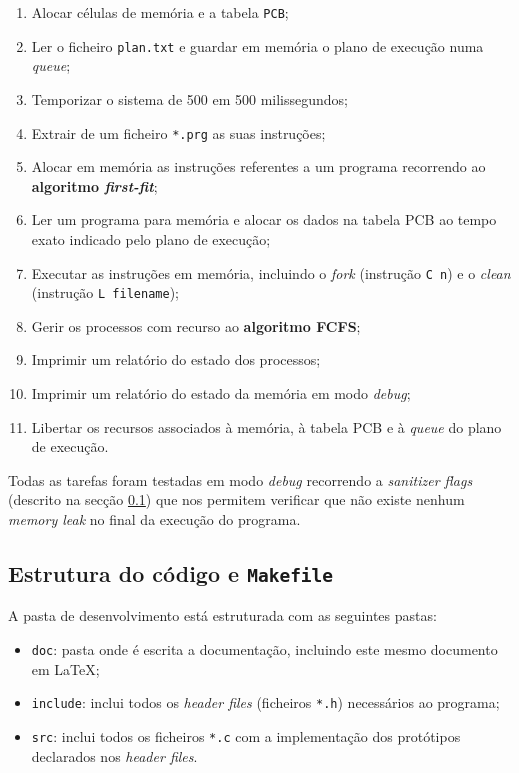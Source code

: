 \documentclass[a4paper,11pt,onecolumn,oneside]{article}
\begin{document}
	\begin{enumerate}
		\item Alocar células de memória e a tabela \texttt{\ac{PCB}};
		\item Ler o ficheiro \texttt{plan.txt} e guardar em memória o plano de execução numa \textit{queue};
		\item Temporizar o sistema de 500 em 500 milissegundos;
		\item Extrair de um ficheiro \texttt{*.prg} as suas instruções;
		\item Alocar em memória as instruções referentes a um programa recorrendo ao \textbf{algoritmo \textit{first-fit}};
		\item Ler um programa para memória e alocar os dados na tabela PCB ao tempo exato indicado pelo plano de execução;
		\item Executar as instruções em memória, incluindo o \textit{fork} (instrução \verb|C n|) e o \textit{clean} (instrução \verb|L filename|);
		\item Gerir os processos com recurso ao \textbf{algoritmo FCFS};
		\item Imprimir um relatório do estado dos processos;
		\item Imprimir um relatório do estado da memória em modo \textit{debug};
		\item Libertar os recursos associados à memória, à tabela PCB e à \textit{queue} do plano de execução.
	\end{enumerate}
	
	Todas as tarefas foram testadas em modo \textit{debug} recorrendo a \textit{sanitizer flags} (descrito na secção \ref{ssec:dev:struct_makefile}) que nos permitem verificar que não existe nenhum \textit{memory leak} no final da execução do programa.
	
	
	\subsection{Estrutura do código e \texttt{Makefile}}
	\label{ssec:dev:struct_makefile}
	
	A pasta de desenvolvimento está estruturada com as seguintes pastas:
	
	\begin{itemize}
		\item \verb|doc|: pasta onde é escrita a documentação, incluindo este mesmo documento em \LaTeX;
		\item \verb|include|: inclui todos os \textit{header files} (ficheiros \verb|*.h|) necessários ao programa;
		\item \verb|src|: inclui todos os ficheiros \verb|*.c| com a implementação dos protótipos declarados nos \textit{header files}.
	\end{itemize}
	
\end{document}
